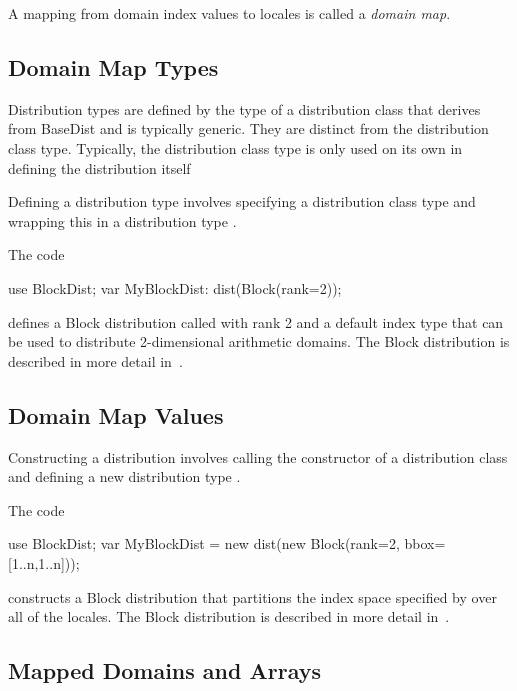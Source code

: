 \label{Domain_Maps}

A mapping from domain index values to locales is called a \emph{domain
map}.

\subsection{Domain Map Types}
\label{Domain_Map_Types}

Distribution types are defined by the type of a distribution class
that derives from BaseDist and is typically generic.  They are
distinct from the distribution class type.  Typically, the
distribution class type is only used on its own in defining the
distribution itself~

Defining a distribution type involves specifying a distribution class
type and wrapping this in a distribution type .
\begin{example}
The code
\begin{chapel}
use BlockDist;
var MyBlockDist: dist(Block(rank=2));
\end{chapel}
defines a Block distribution called  with rank 2 and
a default index type that can be used to distribute 2-dimensional
arithmetic domains.  The Block distribution is described in more
detail in~.
\end{example}

\subsection{Domain Map Values}
\label{Domain_Map_Values}

Constructing a distribution involves calling the constructor of a
distribution class and defining a new distribution type .
\begin{example}
The code
\begin{chapel}
use BlockDist;
var MyBlockDist = new dist(new Block(rank=2, bbox=[1..n,1..n]));
\end{chapel}
constructs a Block distribution that partitions the index space
specified by \chpl{[1..n, 1..n]} over all of the locales.  The Block
distribution is described in more detail in~.
\end{example}

\subsection{Mapped Domains and Arrays}
\label{Mapped_Domains_and_Arrays}

